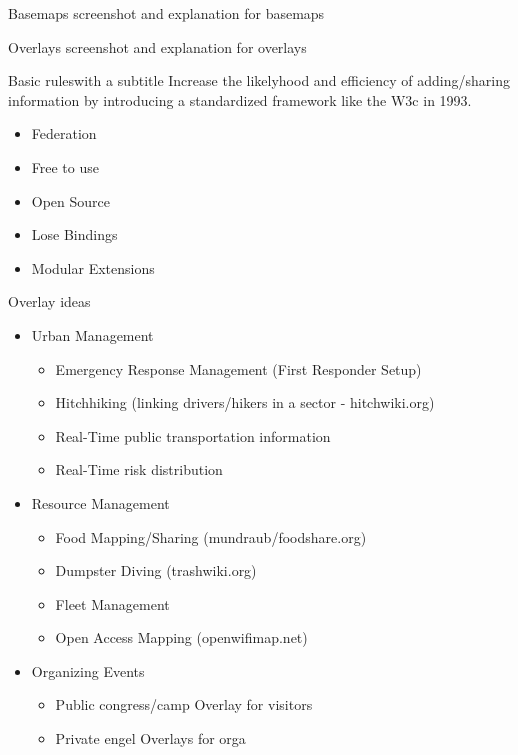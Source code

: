 \documentclass{beamer}
\begin{document}
\begin{frame}{Basemaps}
screenshot and explanation for basemaps
\end{frame}

\begin{frame}{Overlays}
screenshot and explanation for overlays
\end{frame}

\begin{frame}{Basic rules}{with a subtitle}
Increase the likelyhood and efficiency of adding/sharing information by introducing
a standardized framework like the W3c in 1993.
 \begin{itemize}
  \item Federation
  \item Free to use
  \item Open Source
  \item Lose Bindings
  \item Modular Extensions
 \end{itemize}
\end{frame}

\begin{frame}{Overlay ideas}{}
 \begin{itemize}
  \item Urban Management
   \begin{itemize}
    \item Emergency Response Management (First Responder Setup)
    \item Hitchhiking (linking drivers/hikers in a sector - hitchwiki.org)
    \item Real-Time public transportation information
    \item Real-Time risk distribution
   \end{itemize}
  \item Resource Management
   \begin{itemize}
    \item Food Mapping/Sharing (mundraub/foodshare.org)
    \item Dumpster Diving (trashwiki.org)
    \item Fleet Management
    \item Open Access Mapping (openwifimap.net)
   \end{itemize}
  \item Organizing Events
   \begin{itemize}
    \item Public congress/camp Overlay for visitors
    \item Private engel Overlays for orga
   \end{itemize}

 \end{itemize}
\end{frame}
\end{document}
